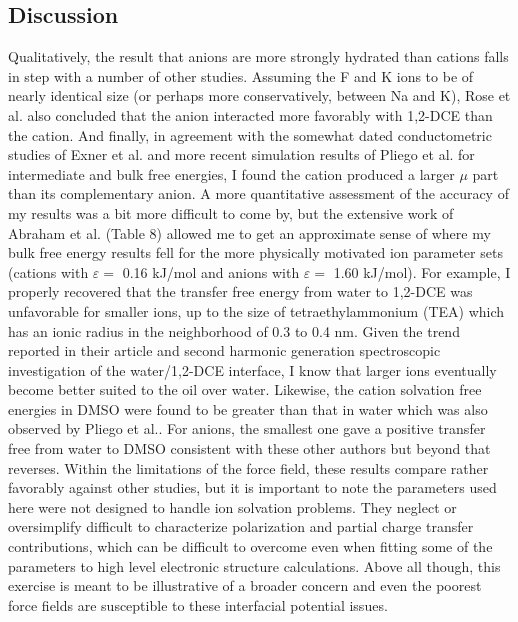 \begin{tatb}
  \section{\label{ch6:sec3:level1}Discussion~}
  Qualitatively, the result that anions are more strongly hydrated than cations falls in step with a number of other studies\cite{wipff1999tatb, pliego2015ccqct,
  ren2003amoeba, collins2007review, collins1995}. Assuming the F\sur{-} and K\sur{+} ions to be of nearly identical size (or perhaps more conservatively, between
  Na\sur{+} and K\sur{+})\cite{wright2010ionsize}, Rose et al. also concluded that the anion interacted more favorably with 1,2-DCE than the cation\cite{rose2009}. 
  And finally, in agreement with the somewhat dated conductometric studies of Exner et al.\cite{exner1974dmso} and more recent simulation results of Pliego et al. for
  intermediate\cite{pliego2002dmso} and bulk free energies\cite{pliego2015ccqct}, I found the cation produced a larger $\mu$ part than its complementary anion. A
  more quantitative assessment of the accuracy of my results was a bit more difficult to come by, but the extensive work of Abraham et al. (Table 8)\cite{abraham1978} 
  allowed me to get an approximate sense of where my bulk free energy results fell for the more physically motivated ion parameter sets (cations with $\varepsilon
  =$ 0.16 kJ/mol and anions with $\varepsilon =$ 1.60 kJ/mol). For example, I properly recovered that the transfer free energy from water to 
  1,2-DCE was unfavorable for smaller ions, up to the size of tetraethylammonium (TEA\sur{+}) which has an ionic radius in the neighborhood of 0.3 to 0.4 
  nm\cite{aue1976tea}. Given the trend reported in their article and second harmonic generation spectroscopic investigation of the water/1,2-DCE 
  interface\cite{conboy1997shg_tatb}, I know that larger ions eventually become better suited to the oil over water. Likewise, the cation solvation free energies in
  DMSO were found to be greater than that in water which was also observed by Pliego et al.\cite{pliego2002dmso}. For anions, the smallest one gave a positive transfer 
  free from water to DMSO consistent with these other authors but beyond that reverses. Within the limitations of the force field, these results compare rather favorably
  against other studies, but it is important to note the parameters used here were not designed to handle ion solvation problems. They neglect or oversimplify difficult
  to characterize polarization and partial charge transfer contributions\cite{pollard2016review}, which can be difficult to overcome even when fitting some of the parameters
  to high level electronic structure calculations\cite{ayse2016ecpc}. Above all though, this exercise is meant to be illustrative of a broader concern and even the
  poorest force fields are susceptible to these interfacial potential issues.


\end{tatb}
